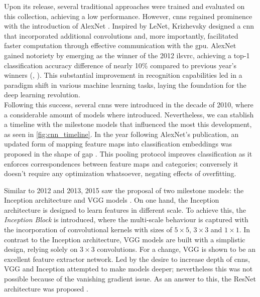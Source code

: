 Upon its release, several traditional approaches were trained and evaluated on this collection, 
achieving a low performance. However, \glspl{cnn} regained prominence with the introduction of
AlexNet \autocite{krizhevsky2012imagenet}. Inspired by LeNet, Krizhevsky designed a 
\gls{cnn} that incorporated additional convolutions and, more importantly, facilitated faster 
computation through effective communication with the \gls{gpu}.
AlexNet gained notoriety by emerging as the winner of the 2012 \gls{ilsvrc}, achieving a top-1 
classification accuracy difference of nearly 10\% compared to previous year's winners 
(\cite{berg2010large}, \cite{sanchez2011high}). This substantial improvement in recognition 
capabilities led in a paradigm shift in various machine learning tasks, laying the foundation 
for the deep learning revolution.\\

\noindent Following this success, several \glspl{cnn} were introduced in the decade of 2010, where 
a considerable amount of models where introduced. Nevertheless, we can stablish a timeline with the 
milestone models that influenced the most this development, as seen in \autoref{fig:cnn_timeline}.
In the year following AlexNet's publication, an updated form of mapping feature maps into 
classification embeddings was proposed  in the shape of \gls{gap} \autocite{lin2013network}. 
This pooling protocol improves classification as it enforces correspondences between feature maps 
and categories; conversely it doesn't require any optimization whatsoever, negating effects of 
overfitting. 

Similar to 2012 and 2013, 2015 saw the proposal of two milestone models: the Inception architecture 
\autocite{szegedy2015going} and VGG models \autocite{simonyan2015deep}. On one hand, the Inception 
architecture is designed to learn features in different scale. To achieve this, the \emph{Inception 
Block} is introduced, where the multi-scale behaviour is captured with the incorporation of 
convolutional kernels with sizes of $5\times5$, $3\times 3$ and $1\times1$. In contrast to 
the Inception architecture, VGG models are built with a simplistic design, relying solely on 
$3\times 3$ convolutions. For a change, VGG is shown to be an excellent feature extractor network. 
Led by the desire to increase depth of \glspl{cnn}, VGG and Inception attempted to make models 
deeper; nevertheless this was not possible because of the vanishing gradient issue. As an answer to 
this, the ResNet architecture was proposed \autocite{he2016deep}.\\

